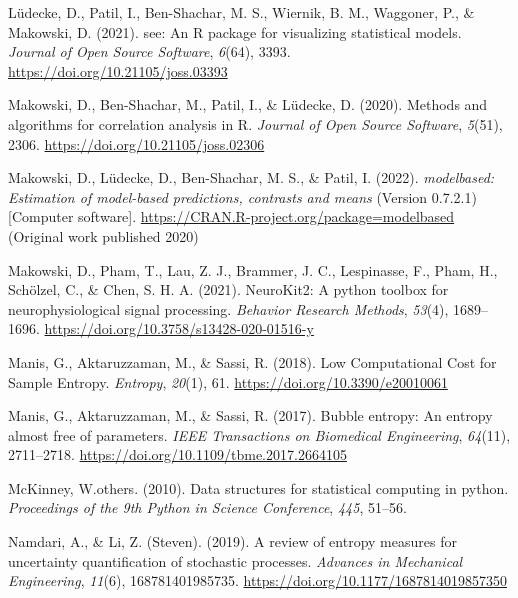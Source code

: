 \documentclass[
  man]{apa6}
\newlength{\cslhangindent}
\newlength{\cslentryspacingunit} %
\newenvironment{CSLReferences}[2] %
 {%
  \setlength{\parindent}{0pt}
  \ifodd #1
  \let\oldpar\par
  \def\par{\hangindent=\cslhangindent\oldpar}
  \fi
  \setlength{\parskip}{#2\cslentryspacingunit}
 }%
 {}
\begin{document}
\begin{CSLReferences}{1}{0}
\leavevmode{}%
Lüdecke, D., Patil, I., Ben-Shachar, M. S., Wiernik, B. M., Waggoner, P., \& Makowski, D. (2021). {see}: An {R} package for visualizing statistical models. \emph{Journal of Open Source Software}, \emph{6}(64), 3393. \url{https://doi.org/10.21105/joss.03393}

\leavevmode{}%
Makowski, D., Ben-Shachar, M., Patil, I., \& Lüdecke, D. (2020). Methods and algorithms for correlation analysis in {R}. \emph{Journal of Open Source Software}, \emph{5}(51), 2306. \url{https://doi.org/10.21105/joss.02306}

\leavevmode{}%
Makowski, D., Lüdecke, D., Ben-Shachar, M. S., \& Patil, I. (2022). \emph{{modelbased}: Estimation of model-based predictions, contrasts and means} (Version 0.7.2.1) {[}Computer software{]}. \url{https://CRAN.R-project.org/package=modelbased} (Original work published 2020)

\leavevmode{}%
Makowski, D., Pham, T., Lau, Z. J., Brammer, J. C., Lespinasse, F., Pham, H., Schölzel, C., \& Chen, S. H. A. (2021). {NeuroKit}2: A python toolbox for neurophysiological signal processing. \emph{Behavior Research Methods}, \emph{53}(4), 1689--1696. \url{https://doi.org/10.3758/s13428-020-01516-y}

\leavevmode{}%
Manis, G., Aktaruzzaman, M., \& Sassi, R. (2018). Low Computational Cost for Sample Entropy. \emph{Entropy}, \emph{20}(1), 61. \url{https://doi.org/10.3390/e20010061}

\leavevmode{}%
Manis, G., Aktaruzzaman, M., \& Sassi, R. (2017). Bubble entropy: An entropy almost free of parameters. \emph{IEEE Transactions on Biomedical Engineering}, \emph{64}(11), 2711--2718. \url{https://doi.org/10.1109/tbme.2017.2664105}

\leavevmode{}%
McKinney, W.others. (2010). Data structures for statistical computing in python. \emph{Proceedings of the 9th Python in Science Conference}, \emph{445}, 51--56.

\leavevmode{}%
Namdari, A., \& Li, Z. (Steven). (2019). A review of entropy measures for uncertainty quantification of stochastic processes. \emph{Advances in Mechanical Engineering}, \emph{11}(6), 168781401985735. \url{https://doi.org/10.1177/1687814019857350}


\end{CSLReferences}
\end{document}
